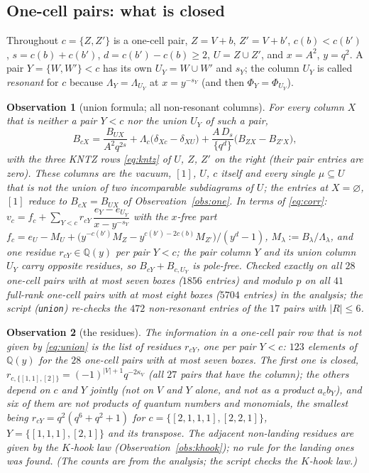 \documentclass[11pt]{article}
\newtheorem{observation}{Observation}
\newcommand{\Lam}{\Lambda}
\newcommand{\vac}{\varnothing}
\newcommand{\LMPH}[1]{\texttt{#1}}
\begin{document}
\subsection*{One-cell pairs: what is closed}

Throughout $c=\{Z,Z'\}$ is a one-cell pair, $Z=V+b$, $Z'=V+b'$, $c(b)<c(b')$, $s=c(b)+c(b')$, $d=c(b')-c(b)\ge2$,
$U=Z\cup Z'$, and $x=A^2$, $y=q^2$.  A pair $Y=\{W,W'\}<c$ has its own $U_Y=W\cup W'$ and $s_Y$; the column $U_Y$ is called
\emph{resonant} for $c$ because $\Lam_Y=\Lam_{U_Y}$ at $x=y^{-s_Y}$ (and then $\Phi_Y=\Phi_{U_Y}$).

\begin{observation}[union formula; all non-resonant columns]\label{obs:union}
For every column $X$ that is neither a pair $Y<c$ nor the union $U_Y$ of such a pair,
\begin{equation}\label{eq:union}
B_{cX}=\frac{B_{UX}}{A^2q^{2s}}+\Lam_c\bigl(\delta_{Xc}-\delta_{XU}\bigr)+\frac{A\,D_s}{\{q^d\}}\bigl(B_{ZX}-B_{Z'X}\bigr),
\end{equation}
with the three KNTZ rows \eqref{eq:kntz} of $U$, $Z$, $Z'$ on the right (their pair entries are zero).  These columns are
the vacuum, $[1]$, $U$, $c$ itself and every single $\mu\subseteq U$ that is not the union of two incomparable
subdiagrams of $U$; the entries at $X=\vac$, $[1]$ reduce to $B_{cX}=B_{UX}$ of Observation~\ref{obs:one}.  In terms of
\eqref{eq:corr}: $v_c=f_c+\sum_{Y<c}r_{cY}\,\dfrac{e_Y-e_{U_Y}}{x-y^{-s_Y}}$ with the $x$-free part
$f_c=e_U-M_U+\bigl(y^{-c(b')}M_Z-y^{c(b')-2c(b)}M_{Z'}\bigr)/(y^d-1)$, $M_\lambda:=B_\lambda/\Lam_\lambda$, and one
residue $r_{cY}\in\mathbb Q(y)$ per pair $Y<c$; the pair column $Y$ and its union column $U_Y$ carry opposite residues, so
$B_{cY}+B_{c,U_Y}$ is pole-free.  Checked exactly on all $28$ one-cell pairs with at most seven boxes ($1856$ entries)
and modulo $p$ on all $41$ full-rank one-cell pairs with at most eight boxes ($5704$ entries) in the analysis; the
script (\LMPH{union}) re-checks the $472$ non-resonant entries of the $17$ pairs with $|R|\le6$.
\end{observation}

\begin{observation}[the residues]\label{obs:res}
The information in a one-cell pair row that is not given by \eqref{eq:union} is the list of residues $r_{cY}$, one per
pair $Y<c$: $123$ elements of $\mathbb Q(y)$ for the $28$ one-cell pairs with at most seven boxes.  The first one is closed,
$r_{c,\{[1,1],[2]\}}=(-1)^{|V|+1}q^{-2\kappa_V}$ (all $27$ pairs that have the column); the others depend on $c$ and $Y$
jointly (not on $V$ and $Y$ alone, and not as a product $a_cb_Y$), and six of them are not products of quantum numbers
and monomials, the smallest being $r_{cY}=q^2(q^6+q^2+1)$ for $c=\{[2,1,1,1],[2,2,1]\}$, $Y=\{[1,1,1],[2,1]\}$ and
its transpose.  The adjacent non-landing residues are given by the $K$-hook law (Observation~\ref{obs:khook});
no rule for the landing ones was found.  (The counts are from the analysis; the script checks the $K$-hook law.)
\end{observation}
\end{document}
